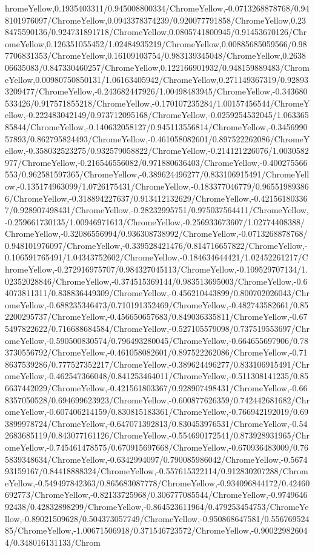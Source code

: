 {\begin{tikzternal}
hromeYellow,0.1935403311/0.945008800334/ChromeYellow,-0.0713268878768/0.948101976097/ChromeYellow,0.0943378374239/0.920077791858/ChromeYellow,0.238475590136/0.924731891718/ChromeYellow,0.0805741800945/0.91453670126/ChromeYellow,0.126351055452/1.02484935219/ChromeYellow,0.00885685059566/0.987706831353/ChromeYellow,0.16109103754/0.983139345048/ChromeYellow,0.263806635083/0.847330460257/ChromeYellow,0.122166901932/0.948159889483/ChromeYellow,0.00980750850131/1.06163405942/ChromeYellow,0.271149367319/0.928933209477/ChromeYellow,-0.243682447926/1.00498483945/ChromeYellow,-0.343680533426/0.917571855218/ChromeYellow,-0.170107235284/1.00157456544/ChromeYellow,-0.222483042149/0.973712095168/ChromeYellow,-0.0259254532045/1.06336585844/ChromeYellow,-0.140632058127/0.945113556814/ChromeYellow,-0.345699057893/0.862795824493/ChromeYellow,-0.461058082601/0.897522262086/ChromeYellow,-0.358032523275/0.932579058822/ChromeYellow,-0.214121226076/1.0030582977/ChromeYellow,-0.216546556082/0.971880636403/ChromeYellow,-0.400275566553/0.962581597365/ChromeYellow,-0.389624496277/0.833106915491/ChromeYellow,-0.135174963099/1.0726175431/ChromeYellow,-0.183377046779/0.965519893866/ChromeYellow,-0.318894227637/0.913412132629/ChromeYellow,-0.421561803367/0.928907498431/ChromeYellow,-0.28232995751/0.975037564411/ChromeYellow,-0.259661730135/1.00946971613/ChromeYellow,-0.256933673607/1.02774408388/ChromeYellow,-0.32086556994/0.936308738992/ChromeYellow,-0.0713268878768/0.948101976097/ChromeYellow,-0.339528421476/0.814716657822/ChromeYellow,-0.106591765491/1.04343752602/ChromeYellow,-0.184634644421/1.02452261217/ChromeYellow,-0.272916975707/0.984327045113/ChromeYellow,-0.109529707134/1.02352028846/ChromeYellow,-0.374515369144/0.983513695003/ChromeYellow,-0.64073811311/0.838836449309/ChromeYellow,-0.456210443899/0.800702026043/ChromeYellow,-0.688235346473/0.710191352469/ChromeYellow,-0.482743582661/0.852200295737/ChromeYellow,-0.456650657683/0.849036335811/ChromeYellow,-0.675497822622/0.716688684584/ChromeYellow,-0.527105579098/0.737519553697/ChromeYellow,-0.590500830574/0.796493280045/ChromeYellow,-0.664655697906/0.783730556792/ChromeYellow,-0.461058082601/0.897522262086/ChromeYellow,-0.718637539286/0.777527352217/ChromeYellow,-0.389624496277/0.833106915491/ChromeYellow,-0.462547366048/0.841253464011/ChromeYellow,-0.511308141235/0.856637442029/ChromeYellow,-0.421561803367/0.928907498431/ChromeYellow,-0.668357050528/0.694699623923/ChromeYellow,-0.600877626359/0.742442681682/ChromeYellow,-0.607406214159/0.830815183361/ChromeYellow,-0.766942192019/0.693899978724/ChromeYellow,-0.647071392813/0.830453976531/ChromeYellow,-0.542683685119/0.843077161126/ChromeYellow,-0.554690172541/0.873928931965/ChromeYellow,-0.745461478575/0.670915697668/ChromeYellow,-0.670936483009/0.765839348634/ChromeYellow,-0.6342994097/0.790085986042/ChromeYellow,-0.567493159167/0.84418888324/ChromeYellow,-0.557615322114/0.912830207288/ChromeYellow,-0.549497842363/0.865683087778/ChromeYellow,-0.934096844172/0.42460692773/ChromeYellow,-0.82133725968/0.306777085544/ChromeYellow,-0.974964692438/0.42832898299/ChromeYellow,-0.864523611964/0.479253454753/ChromeYellow,-0.89021509628/0.504373057749/ChromeYellow,-0.950868647581/0.55676952485/ChromeYellow,-1.00671506918/0.371546723572/ChromeYellow,-0.900229826044/0.348016131133/Chrom
\end{tikzternal}}
